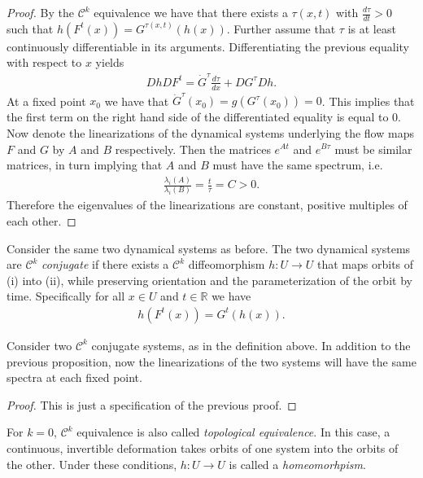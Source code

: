 \begin{proof}
	By the $\mathcal{C}^k$ equivalence we have that there exists a $\tau (x,t)$ with $\frac{d \tau}{d t}>0$ such that $h(F^{t}(x)) = G^{\tau(x,t)}(h(x))$. Further assume that $\tau$ is at least continuously differentiable in its arguments. Differentiating the previous equality with respect to  $x$ yields
	\begin{align}
		Dh DF^{t} = \dot{G}^{\tau }\frac{d \tau }{dx} + D G^{\tau} Dh.
	\end{align}
	At a fixed point $x_0$ we have that $\dot{G}^{\tau}(x_0)=g(G^{\tau}(x_0))=0$. This implies that the first term on the right hand side of the differentiated equality is equal to 0. Now denote the linearizations of the dynamical systems underlying the flow maps $F$ and $G$ by $A$ and $B$ respectively. Then the matrices $e^{A t} $ and $e^{B\tau} $ must be similar matrices, in turn implying that $ A $ and $B$ must have the same spectrum, i.e.
	\begin{align}
		\frac{\lambda_i(A)}{\lambda_i(B)} = \frac{t}{\tau} = C >0. 
	\end{align}
Therefore the eigenvalues of the linearizations are constant, positive multiples	of each other.
\end{proof}


\begin{definition}
	Consider the same two dynamical systems as before. The two dynamical systems are $\mathcal{C}^k$ \emph{conjugate} if there exists a $\mathcal{C}^k$ diffeomorphism $h:U \to U$ that maps orbits of (i) into (ii), while preserving orientation and the parameterization of the orbit by time. Specifically for all $x \in U$ and $t \in \mathbb{R}$ we have
	\begin{align}
		\boxed{
			h(F^{t}(x)) = G^{t}(h(x)).
		}
	\end{align}
\end{definition}

\begin{proposition}
	Consider two $\mathcal{C}^{k}$ conjugate systems, as in the definition above. In addition to the previous proposition, now the linearizations of the two systems will have the same spectra at each fixed point.
\end{proposition}
\begin{proof}
	This is just a specification of the previous proof.
\end{proof}


\begin{definition}
	For $k=0$, $\mathcal{C}^{k}$ equivalence is also called \emph{topological equivalence}. In this case, a continuous, invertible deformation takes orbits of one system into the orbits of the other. Under these conditions,  $h:U\to U$ is called a \emph{homeomorhpism}.
\end{definition}

